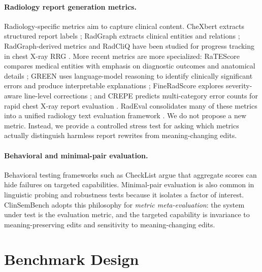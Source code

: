 \documentclass[11pt]{article}
\newcommand{\bench}{ClinSemBench\xspace}
\begin{document}
\paragraph{Radiology report generation metrics.}
Radiology-specific metrics aim to capture clinical content. CheXbert extracts structured report labels \citep{smit-etal-2020-chexbert}; RadGraph extracts clinical entities and relations \citep{jain-etal-2021-radgraph}; RadGraph-derived metrics and RadCliQ have been studied for progress tracking in chest X-ray RRG \citep{yu-etal-2023-evaluating}. More recent metrics are more specialized: RaTEScore compares medical entities with emphasis on diagnostic outcomes and anatomical details \citep{zhao-etal-2024-ratescore}; GREEN uses language-model reasoning to identify clinically significant errors and produce interpretable explanations \citep{ostmeier-etal-2024-green}; FineRadScore explores severity-aware line-level corrections \citep{huang-etal-2024-fineradscore}; and CREPE predicts multi-category error counts for rapid chest X-ray report evaluation \citep{cho-etal-2025-crepe}. RadEval consolidates many of these metrics into a unified radiology text evaluation framework \citep{xu-etal-2025-radeval}. We do not propose a new metric. Instead, we provide a controlled stress test for asking which metrics actually distinguish harmless report rewrites from meaning-changing edits.

\paragraph{Behavioral and minimal-pair evaluation.}
Behavioral testing frameworks such as CheckList \citep{ribeiro-etal-2020-beyond} argue that aggregate scores can hide failures on targeted capabilities. Minimal-pair evaluation is also common in linguistic probing and robustness tests because it isolates a factor of interest. \bench adopts this philosophy for \emph{metric meta-evaluation}: the system under test is the evaluation metric, and the targeted capability is invariance to meaning-preserving edits and sensitivity to meaning-changing edits.


\section{Benchmark Design}
\end{document}
